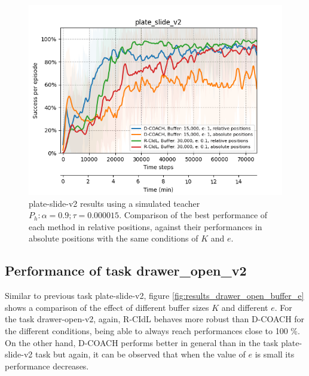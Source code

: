 \begin{figure}[H]
    \centering
    \includegraphics[width=.60\textwidth]{figures/hockey_best_v2.png}
    \caption{plate-slide-v2 results using a simulated teacher $P_h: \alpha = 0.9; \tau =  0.000015$. Comparison of the best performance of each method in relative positions, against their performances in absolute positions with the same conditions of $K$ and $e$.}
    \label{fig:results_plate_slide_best}
\end{figure}

\subsection{Performance of task drawer\_open\_v2}
\label{subsection:Performance of task drawer_open_v2}

Similar to previous task plate-slide-v2, figure \ref{fig:results_drawer_open_buffer_e} shows a comparison of the effect of different buffer sizes $K$ and different $e$. For the task drawer-open-v2, again, R-CIdL behaves more robust than D-COACH for the different conditions, being able to always reach performances close to 100 \%. On the other hand, D-COACH performs better in general than in the task plate-slide-v2 task but again, it can be observed that when the value of $e$ is small its performance decreases.


